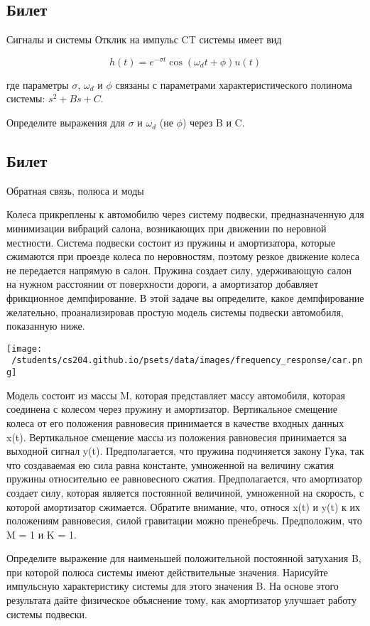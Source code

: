 \documentclass{exam}
\begin{document}
\newpage
\begin{questions}
\section{Билет}
	\question 
	Сигналы и системы 
	\question 
Отклик на импульс CT системы имеет вид

\[
h(t)=e^{-\sigma t} \cos(\omega_dt+\phi)u(t)
\]

где параметры \(\sigma\), \(\omega_d\) и \(\phi\) связаны с параметрами 
характеристического полинома системы: \(s^2 + Bs + C\).

Определите выражения для \(\sigma\) и \(\omega_d\)  
(не \(\phi\))  через B и C.

\end{questions}
\vspace{15pt}


\newpage
\begin{questions}
\section{Билет}
	\question 
Обратная связь, полюса и моды 

	\question 
Колеса прикреплены к автомобилю через систему подвески, 
предназначенную для минимизации вибраций салона, возникающих 
при движении по неровной местности.
Система подвески состоит из пружины и амортизатора, которые 
сжимаются при проезде колеса по неровностям, поэтому резкое 
движение колеса не передается напрямую в салон.
Пружина создает силу, удерживающую салон на нужном расстоянии 
от поверхности дороги, а амортизатор добавляет фрикционное демпфирование.
В этой задаче вы определите, какое демпфирование желательно, 
проанализировав простую модель системы подвески автомобиля, показанную ниже.


	\texttt{[image: ~/students/cs204.github.io/psets/data/images/frequency\_response/car.png]}

Модель состоит из массы M, которая представляет массу автомобиля, 
которая соединена с колесом через пружину и амортизатор.
Вертикальное смещение колеса от его положения равновесия принимается 
в качестве входных данных x(t).
Вертикальное смещение массы из положения равновесия принимается за выходной сигнал y(t).
Предполагается, что пружина подчиняется закону Гука, так что создаваемая 
ею сила равна константе, умноженной на величину сжатия пружины относительно 
ее равновесного сжатия.
Предполагается, что амортизатор создает силу, которая является постоянной 
величиной, умноженной на скорость, с которой амортизатор сжимается.
Обратите внимание, что, относя x(t) и y(t) к их положениям равновесия, 
силой гравитации можно пренебречь.
Предположим, что M = 1 и K = 1.
	
Определите выражение для наименьшей положительной 
		постоянной затухания B, при которой полюса системы имеют 
		действительные значения.  
		Нарисуйте импульсную характеристику системы для этого значения B.  
		На основе этого результата дайте физическое объяснение тому, 
		как амортизатор улучшает работу системы подвески.
\end{questions}
\vspace{15pt}
\end{document}

